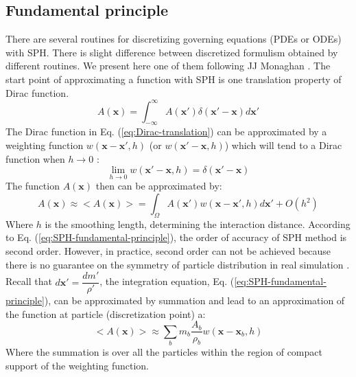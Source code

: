 \documentclass[journal abbreviation, manuscript]{copernicus}
\begin{document}
\subsection{Fundamental principle}
There are several routines for discretizing governing equations (PDEs or ODEs) with SPH. There is slight difference between discretized formulism obtained by different routines. We present here one of them following JJ Monaghan \citep{monaghan1992smoothed, monaghan2005smoothed}. The start point of approximating a function with SPH is one translation property of Dirac function.
\begin{equation}
A(\textbf{x})=\int_{-\infty}^{\infty} A(\textbf{x} \prime) \delta (\textbf{x} \prime - \textbf{x}) d\textbf{x} \prime
\label{eq:Dirac-translation}
\end{equation}
The Dirac function in Eq. (\ref{eq:Dirac-translation}) can be approximated by a weighting function $w(\textbf{x}-\textbf{x}\prime, h)$ (or $w(\textbf{x}\prime-\textbf{x}, h)$) which will tend to a Dirac function when $h \rightarrow 0$ :
\begin{equation}
\lim _{h \rightarrow 0} w(\textbf{x} \prime-\textbf{x}, h) =  \delta (\textbf{x} \prime - \textbf{x})
\label{eq:SPH_kernel_delta}
\end{equation}
The function $A(\textbf{x})$ then can be approximated by:
\begin{equation}
A(\textbf{x}) \approx <A(\textbf{x})> = \int_{\Omega} A(\textbf{x} \prime) w(\textbf{x}-\textbf{x}\prime, h) d\textbf{x}\prime + O(h^2)
\label{eq:SPH-fundamental-principle}
\end{equation}
Where $h$ is the smoothing length, determining the interaction distance. According to Eq. (\ref{eq:SPH-fundamental-principle}), the order of accuracy of SPH method is second order. However, in practice, second order can not be achieved because there is no guarantee on the symmetry of particle distribution in real simulation \citep{price2012smoothed}.
Recall that $d\textbf{x}\prime = \dfrac{dm \prime}{\rho \prime}$, the integration equation, Eq. (\ref{eq:SPH-fundamental-principle}), can be approximated by summation and lead to an approximation of the function at particle (discretization point) a:
\begin{equation}
<A(\textbf{x})> \approx \sum_b m_b \dfrac{A_b}{\rho_b} w(\textbf{x}-\textbf{x}_b, h)
\label{eq:SPH-approximation-sum}
\end{equation}
Where the summation is over all the particles within the region of compact support of the weighting function. 
\end{document}
